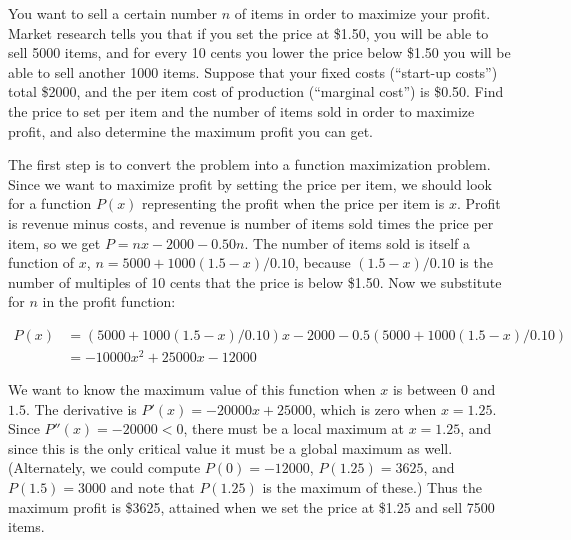 \begin{example}
You want to sell a certain number $n$ of items in order to maximize your
profit.  Market research tells you that if you set the price at \$1.50, you
will be able to sell 5000 items, and for every 10 cents you lower the price
below \$1.50 you will be able to sell another 1000 items.  Suppose that
your fixed costs (``start-up costs'') total \$2000, and the per item cost
of production (``marginal cost'') is \$0.50.  Find the price to set per
item and the number of items sold in order to maximize profit, and also
determine the maximum profit you can get.

The first step is to convert the problem into a function maximization
problem. Since we want to maximize profit by setting the price per
item, we should look for a function $P(x)$ representing the profit
when the price per item is $x$. Profit is revenue minus costs, and
revenue is number of items sold times the price per item, so we get
$P=nx-2000-0.50n$. The number of items sold is itself a function of
$x$, $n=5000+1000(1.5-x)/0.10$, because $ (1.5-x)/0.10$ is the number
of multiples of 10 cents that the price is below \$1.50.
Now we substitute for $n$ in the profit function:

\begin{align*}
  P(x) &= (5000+1000(1.5-x)/0.10)x-2000- 0.5(5000+1000(1.5-x)/0.10) \\
       &=-10000x^2+25000x-12000 
\end{align*}

We want to know the maximum value of this function when $x$ is
between 0 and $1.5$. The derivative is $P'(x)=-20000x+25000$, which
is zero when $x=1.25$. Since $P''(x)=-20000<0$, there must be a local
maximum at $x=1.25$, and since this is the only critical value it must
be a global maximum as well. (Alternately, we could compute
$P(0)=-12000$, $P(1.25)=3625$, and $P(1.5)=3000$ and note that
$P(1.25)$ is the maximum of these.) Thus the maximum profit is \$3625,
attained when we set the price at \$1.25 and sell 7500 items.
\end{example}




